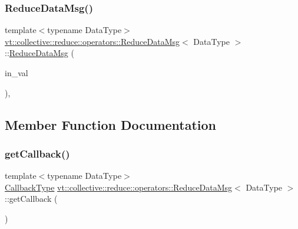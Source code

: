 \subsubsection{\texorpdfstring{Reduce\+Data\+Msg()}{ReduceDataMsg()}\hspace{0.1cm}{\footnotesize\ttfamily [3/3]}}
{\footnotesize\ttfamily template$<$typename Data\+Type$>$ \\
\hyperlink{structvt_1_1collective_1_1reduce_1_1operators_1_1_reduce_data_msg}{vt\+::collective\+::reduce\+::operators\+::\+Reduce\+Data\+Msg}$<$ Data\+Type $>$\+::\hyperlink{structvt_1_1collective_1_1reduce_1_1operators_1_1_reduce_data_msg}{Reduce\+Data\+Msg} (\begin{DoxyParamCaption}\item[{Data\+Type const \&}]{in\+\_\+val }\end{DoxyParamCaption})\hspace{0.3cm}{\ttfamily [inline]}, {\ttfamily [explicit]}}



\subsection{Member Function Documentation}
\mbox{\label{structvt_1_1collective_1_1reduce_1_1operators_1_1_reduce_data_msg_a108582ea1b61db277a5dae6ac08cc708}} 
\subsubsection{\texorpdfstring{get\+Callback()}{getCallback()}}
{\footnotesize\ttfamily template$<$typename Data\+Type$>$ \\
\hyperlink{structvt_1_1collective_1_1reduce_1_1operators_1_1_reduce_data_msg_a299d0d7f62e0e631ef344e345d89a4f3}{Callback\+Type} \hyperlink{structvt_1_1collective_1_1reduce_1_1operators_1_1_reduce_data_msg}{vt\+::collective\+::reduce\+::operators\+::\+Reduce\+Data\+Msg}$<$ Data\+Type $>$\+::get\+Callback (\begin{DoxyParamCaption}{ }\end{DoxyParamCaption})\hspace{0.3cm}{\ttfamily [inline]}}

